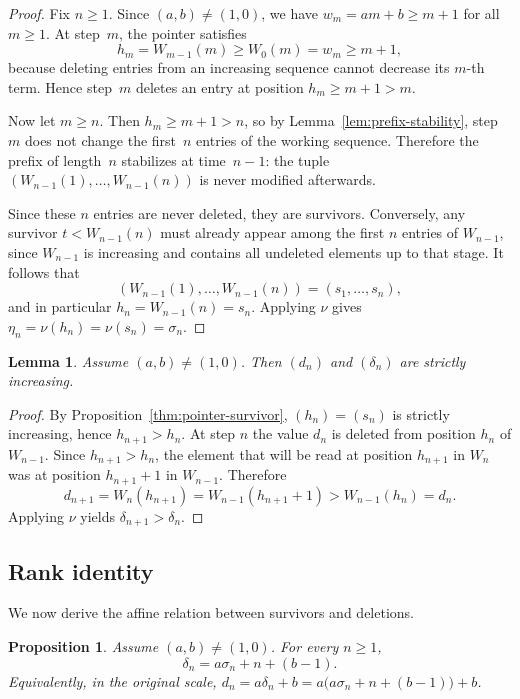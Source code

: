 \documentclass[11pt]{article}
\numberwithin{equation}{section}
\theoremstyle{plain}
\newtheorem{lemma}[theorem]{Lemma}
\newtheorem{proposition}[theorem]{Proposition}
\theoremstyle{definition}
\theoremstyle{remark}
\begin{document}
\begin{proof}
Fix $n\ge1$.  Since $(a,b)\neq(1,0)$, we have $w_m=am+b\ge m+1$ for all
$m\ge1$.  At step~$m$, the pointer satisfies
\[
  h_m = W_{m-1}(m) \ge W_0(m) = w_m \ge m+1,
\]
because deleting entries from an increasing sequence cannot decrease its
$m$-th term.  Hence step~$m$ deletes an entry at position $h_m\ge m+1>m$.

Now let $m\ge n$.  Then $h_m\ge m+1>n$, so by
Lemma~\ref{lem:prefix-stability}, step~$m$ does not change the first~$n$
entries of the working sequence.  Therefore the prefix of length~$n$
stabilizes at time~$n-1$: the tuple
$(W_{n-1}(1),\dots,W_{n-1}(n))$ is never modified afterwards.

Since these $n$ entries are never deleted, they are survivors.
Conversely, any survivor $t<W_{n-1}(n)$ must already appear among the
first $n$ entries of $W_{n-1}$, since $W_{n-1}$ is increasing and
contains all undeleted elements up to that stage.  It follows that
\[
  (W_{n-1}(1),\dots,W_{n-1}(n)) = (s_1,\dots,s_n),
\]
and in particular $h_n=W_{n-1}(n)=s_n$.
Applying $\nu$ gives $\eta_n=\nu(h_n)=\nu(s_n)=\sigma_n$.
\end{proof}


\begin{lemma}\label{lem:mono-deletions}
Assume $(a,b)\neq(1,0)$. Then $(d_n)$ and $(\delta_n)$ are strictly
increasing.
\end{lemma}

\begin{proof}
By Proposition~\ref{thm:pointer-survivor}, $(h_n)=(s_n)$ is strictly
increasing, hence $h_{n+1}>h_n$.
At step $n$ the value $d_n$ is deleted from position $h_n$ of $W_{n-1}$.
Since $h_{n+1}>h_n$, the element that will be read at position $h_{n+1}$
in $W_n$ was at position $h_{n+1}+1$ in $W_{n-1}$. Therefore
\[
  d_{n+1}=W_n(h_{n+1})=W_{n-1}(h_{n+1}+1) > W_{n-1}(h_n)=d_n.
\]
Applying $\nu$ yields $\delta_{n+1}>\delta_n$.
\end{proof}

\subsection{Rank identity}

We now derive the affine relation between survivors and deletions.

\begin{proposition}\label{thm:rank-ab}
Assume $(a,b)\neq(1,0)$. For every $n\ge1$,
\begin{equation}\label{eq:rank-ab}
  \delta_n = a\sigma_n + n + (b-1).
\end{equation}
Equivalently, in the original scale,
$d_n = a\delta_n+b = a\bigl(a\sigma_n + n + (b-1)\bigr)+b$.
\end{proposition}
\end{document}
